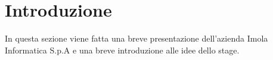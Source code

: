 
\chapter{Introduzione}\label{ch:introduzione}

In questa sezione viene fatta una breve presentazione dell'azienda Imola Informatica S.p.A e una breve introduzione alle idee dello stage.
%
%








